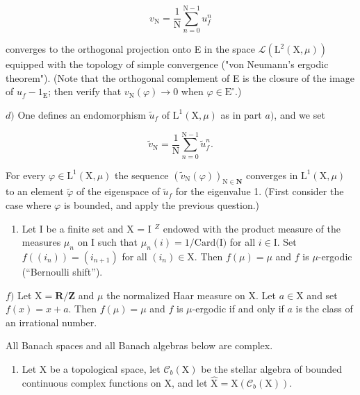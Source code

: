 \[
v _ {\mathrm{N}} = \frac {1}{\mathrm{N}} \sum_ {n = 0} ^ {\mathrm{N-1}} u _ {f} ^ {n}
\]

converges to the orthogonal projection onto E in the space \(\mathcal{L}(\mathrm{L}^{2}(\mathrm{X},\mu))\) equipped with the topology of simple convergence ("von Neumann's ergodic theorem"). (Note that the orthogonal complement of E is the closure of the image of \(u_{f}-1_{\mathrm{E}}\); then verify that \(v_{\mathrm{N}}(\varphi)\to0\) when \(\varphi\in\mathrm{E}^{\circ}\).)

\(d)\) One defines an endomorphism \(\widetilde{u}_f\) of \(\mathrm{L}^1 (\mathrm{X},\mu)\) as in part \(a)\), and we set

\[
\widetilde {v} _ {\mathrm{N}} = \frac {1}{\mathrm{N}} \sum_ {n = 0} ^ {\mathrm{N-1}} \widetilde {u} _ {f} ^ {n}.
\]

For every \(\varphi\in\mathrm{L}^{1}(\mathrm{X},\mu)\) the sequence \((\widetilde{v}_{\mathrm{N}}(\varphi))_{\mathrm{N}\in\mathbf{N}}\) converges in \(\mathrm{L}^{1}(\mathrm{X},\mu)\) to an element \(\widetilde{\varphi}\) of the eigenspace of \(\widetilde{u}_{f}\) for the eigenvalue 1. (First consider the case where \(\varphi\) is bounded, and apply the previous question.)

\begin{enumerate}
\def\labelenumi{\alph{enumi})}
\setcounter{enumi}{4}
\tightlist
\item
  Let I be a finite set and X = I \(^{Z}\) endowed with the product measure of the measures \(\mu_n\) on I such that \(\mu_n(i) = 1/\text{Card(I)}\) for all \(i \in \text{I}\). Set \(f((i_n)) = (i_{n+1})\) for all \((i_n) \in \text{X}\). Then \(f(\mu) = \mu\) and \(f\) is \(\mu\)-ergodic (“Bernoulli shift”).
\end{enumerate}

\(f)\) Let \(\mathrm{X} = \mathbf{R} / \mathbf{Z}\) and \(\mu\) the normalized Haar measure on \(\mathrm{X}\). Let \(a \in \mathrm{X}\) and set \(f(x) = x + a\). Then \(f(\mu) = \mu\) and \(f\) is \(\mu\)-ergodic if and only if \(a\) is the class of an irrational number.


All Banach spaces and all Banach algebras below are complex.

\begin{enumerate}
\def\labelenumi{\arabic{enumi})}
\tightlist
\item
  Let X be a topological space, let \(\mathcal{C}_{b}(\mathrm{X})\) be the stellar algebra of bounded continuous complex functions on X, and let \(\widehat{\mathrm{X}} = \mathrm{X}(\mathcal{C}_{b}(\mathrm{X}))\).
\end{enumerate}

